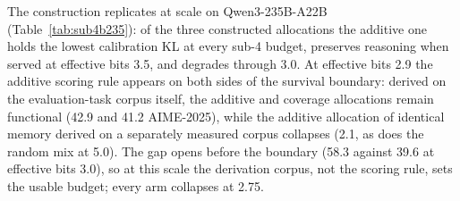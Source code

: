 The construction replicates at scale on Qwen3-235B-A22B (Table~\ref{tab:sub4b235}): of the three
constructed allocations the additive one holds the lowest calibration KL at every sub-4 budget,
preserves reasoning when served at
effective bits 3.5, and degrades through 3.0.
 At effective
bits 2.9 the additive scoring rule appears on both sides of the survival boundary: derived on the
evaluation-task corpus itself, the additive and coverage allocations remain functional (42.9 and
41.2 AIME-2025), while the additive allocation of identical memory derived on a separately measured
corpus collapses (2.1, as does the random mix at 5.0). The gap opens before the boundary (58.3
against 39.6 at effective bits 3.0), so at this scale the derivation corpus, not the scoring rule,
sets the usable budget; every arm collapses at 2.75.





